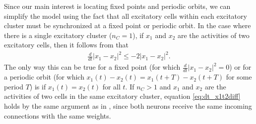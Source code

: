 \documentclass[reqno]{siamonline190516}
\begin{document}
Since our main interest is locating fixed points and periodic orbits, we can simplify the model using the fact that all excitatory cells within each excitatory cluster must be synchronized at a fixed point or periodic orbit. In the case where there is a single excitatory cluster ($n_C = 1$), if $x_1$ and $x_2$ are the activities of two excitatory cells, then it follows from \cite{Barreiro2017} that
\begin{align}\label{eq:dt_x1t2diff}
\frac{d}{dt}|x_1 - x_2|^2 \leq -2 |x_1 - x_2 |^2.
\end{align}
The only way this can be true for a fixed point (for which $\frac{d}{dt} |x_1 - x_2|^2 =0$) or for a periodic orbit (for which $x_1(t)-x_2(t) = x_1(t+T)-x_2(t+T)$ for some period $T$) is if $x_1(t) = x_2(t)$ for all $t$. If $n_C > 1$ and $x_1$ and $x_2$ are the activities of two cells in the same excitatory cluster, equation \cref{eq:dt_x1t2diff} holds by the same argument as in \cite{Barreiro2017}, since both neurons receive the same incoming connections with the same weights. 
\end{document}
